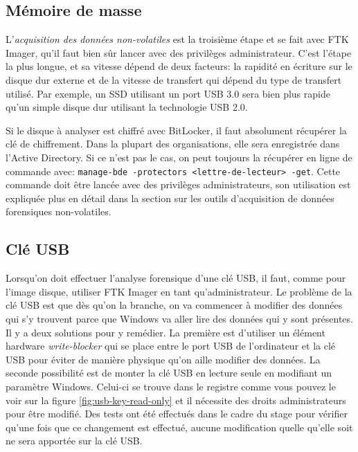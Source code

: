 \subsection{Mémoire de masse}

L'\textit{acquisition des données non-volatiles} est la troisième étape et se fait avec FTK Imager, qu'il faut bien sûr lancer avec des privilèges administrateur. C'est l'étape la plus longue, et sa vitesse dépend de deux facteurs: la rapidité en écriture sur le disque dur externe et de la vitesse de transfert qui dépend du type de transfert utilisé. Par exemple, un SSD utilisant un port USB 3.0 sera bien plus rapide qu'un simple disque dur utilisant la technologie USB 2.0.

Si le disque à analyser est chiffré avec BitLocker, il faut absolument récupérer la clé de chiffrement. Dans la plupart des organisations, elle sera enregistrée dans l'Active Directory. Si ce n'est pas le cas, on peut toujours la récupérer en ligne de commande avec: \texttt{manage-bde -protectors <lettre-de-lecteur> -get}. Cette commande doit être lancée avec des privilèges administrateurs, son utilisation est expliquée plus en détail dans la section sur les outils d'acquisition de données forensiques non-volatiles.





\subsection{Clé USB}

Lorsqu'on doit effectuer l'analyse forensique d'une clé USB, il faut, comme pour l'image disque, utiliser FTK Imager en tant qu'administrateur. Le problème de la clé USB est que dès qu'on la branche, on va commencer à modifier des données qui s'y trouvent parce que Windows va aller lire des données qui y sont présentes. Il y a deux solutions pour y remédier. La première est d'utiliser un élément hardware \textit{write-blocker} qui se place entre le port USB de l'ordinateur et la clé USB pour éviter de manière physique qu'on aille modifier des données. La seconde possibilité est de monter la clé USB en lecture seule en modifiant un paramètre Windows. Celui-ci se trouve dans le registre comme vous pouvez le voir sur la figure \ref{fig:usb-key-read-only} et il nécessite des droits administrateurs pour être modifié. \cite{12} Des tests ont été effectués dans le cadre du stage pour vérifier qu'une fois que ce changement est effectué, aucune modification quelle qu'elle soit ne sera apportée sur la clé USB.

